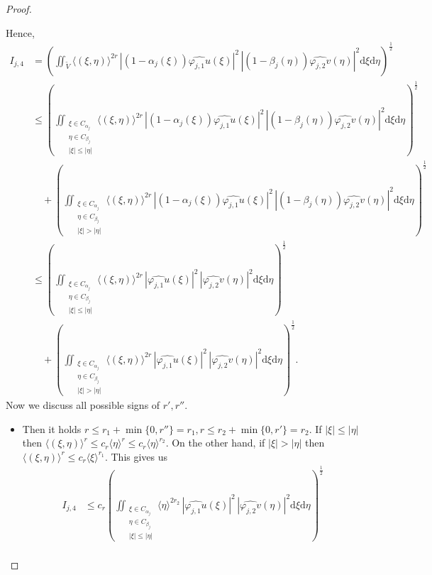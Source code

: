 \documentclass{amsart}
\theoremstyle{definition}
\begin{document}
\begin{proof}
\begin{itemize}
Hence,
\begin{align*}
I_{j,4}
&= \left( \iint_{\widetilde{V}} \langle (\xi , \eta) \rangle^{2r} \, |(1-\alpha_j (\xi)) \widehat{\varphi_{j,1} u} (\xi) |^2 \, |(1-\beta_j (\eta)) \widehat{\varphi_{j,2} v} (\eta)|^2 \mathrm{d}\xi \mathrm{d}\eta \right)^{\frac{1}{2}} \\
&\leq \left( \iint_{\substack{ \xi \in C_{\alpha_j} \\ \eta \in C_{\beta_j} \\ |\xi| \leq |\eta| }} \langle (\xi , \eta) \rangle^{2r} \, |(1-\alpha_j (\xi)) \widehat{\varphi_{j,1} u} (\xi) |^2 \, |(1-\beta_j (\eta)) \widehat{\varphi_{j,2} v} (\eta)|^2 \mathrm{d}\xi \mathrm{d}\eta \right)^{\frac{1}{2}} \\
& \quad + \left( \iint_{\substack{ \xi \in C_{\alpha_j} \\ \eta \in C_{\beta_j} \\ |\xi| > |\eta| }} \langle (\xi , \eta) \rangle^{2r} \, |(1-\alpha_j (\xi)) \widehat{\varphi_{j,1} u} (\xi) |^2 \, |(1-\beta_j (\eta)) \widehat{\varphi_{j,2} v} (\eta)|^2 \mathrm{d}\xi \mathrm{d}\eta \right)^{\frac{1}{2}} \\
&\leq \left( \iint_{\substack{ \xi \in C_{\alpha_j} \\ \eta \in C_{\beta_j} \\ |\xi| \leq |\eta| }} \langle (\xi , \eta) \rangle^{2r} \, |\widehat{\varphi_{j,1} u} (\xi) |^2 \, | \widehat{\varphi_{j,2} v} (\eta)|^2 \mathrm{d}\xi \mathrm{d}\eta \right)^{\frac{1}{2}} \\
& \quad + \left( \iint_{\substack{ \xi \in C_{\alpha_j} \\ \eta \in C_{\beta_j} \\ |\xi| > |\eta| }} \langle (\xi , \eta) \rangle^{2r} \, | \widehat{\varphi_{j,1} u} (\xi) |^2 \, | \widehat{\varphi_{j,2} v} (\eta)|^2 \mathrm{d}\xi \mathrm{d}\eta \right)^{\frac{1}{2}}.
\end{align*}
Now we discuss all possible signs of $r',r''$.
\begin{itemize}
\item[a) \underline{$r',r''\geq 0$:}]
Then it holds $r\leq r_1 + \min \{0,r''\}=r_1 , r\leq r_2 + \min \{0,r'\}=r_2$. If $|\xi| \leq |\eta|$ then $\langle (\xi , \eta) \rangle^{r} \leq c_r \langle \eta \rangle^{r} \leq c_r \langle \eta \rangle^{r_2}$. On the other hand, if $|\xi| > |\eta|$ then $\langle (\xi , \eta) \rangle^{r} \leq c_r \langle \xi \rangle^{r_1}$. This gives us
\begin{align*}
I_{j,4}
& \leq c_r \left( \iint_{\substack{ \xi \in C_{\alpha_j} \\ \eta \in C_{\beta_j} \\ |\xi| \leq |\eta| }} \langle  \eta \rangle^{2r_2} \, |\widehat{\varphi_{j,1} u} (\xi) |^2 \, | \widehat{\varphi_{j,2} v} (\eta)|^2 \mathrm{d}\xi \mathrm{d}\eta \right)^{\frac{1}{2}} \\

\end{align*}
\end{itemize}
\end{itemize}
\end{proof}
\end{document}
